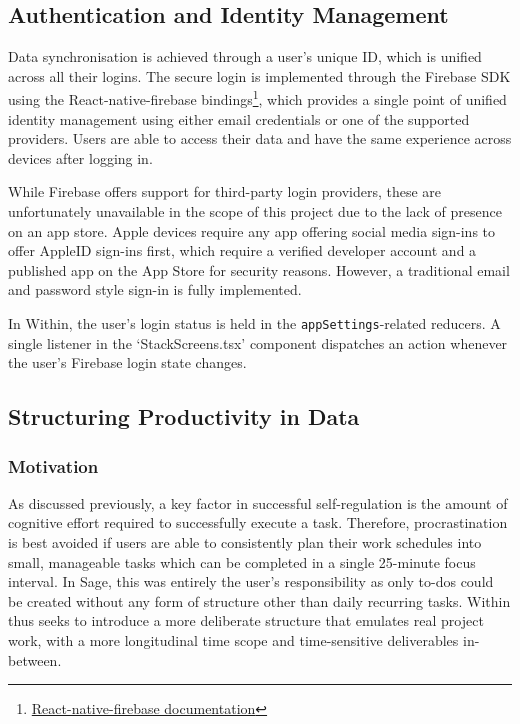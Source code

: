 \subsection{Authentication and Identity Management}
Data synchronisation is achieved through a user's unique ID, which is unified across all their logins. The secure login is implemented through the Firebase SDK using the React-native-firebase bindings\footnote{\href{https://rnfirebase.io}{React-native-firebase documentation}}, which provides a single point of unified identity management using either email credentials or one of the supported providers. Users are able to access their data and have the same experience across devices after logging in.

While Firebase offers support for third-party login providers, these are unfortunately unavailable in the scope of this project due to the lack of presence on an app store. Apple devices require any app offering social media sign-ins to offer AppleID sign-ins first, which require a verified developer account and a published app on the App Store for security reasons. However, a traditional email and password style sign-in is fully implemented.

In Within, the user's login status is held in the \texttt{appSettings}-related reducers. A single listener in the `StackScreens.tsx' component dispatches an action whenever the user's Firebase login state changes.


\subsection{Structuring Productivity in Data}
\subsubsection{Motivation}
As discussed previously, a key factor in successful self-regulation is the amount of cognitive effort required to successfully execute a task. Therefore, procrastination is best avoided if users are able to consistently plan their work schedules into small, manageable tasks which can be completed in a single 25-minute focus interval. In Sage, this was entirely the user's responsibility as only to-dos could be created without any form of structure other than daily recurring tasks. Within thus seeks to introduce a more deliberate structure that emulates real project work, with a more longitudinal time scope and time-sensitive deliverables in-between.

